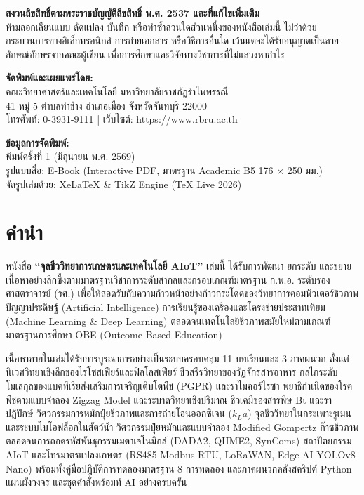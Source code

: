 \documentclass[10pt]{book}
\begin{document}
\vspace{0.2cm}
\noindent\textbf{สงวนลิขสิทธิ์ตามพระราชบัญญัติลิขสิทธิ์ พ.ศ. 2537 และที่แก้ไขเพิ่มเติม}\\
ห้ามลอกเลียนแบบ ดัดแปลง บันทึก หรือทำซ้ำส่วนใดส่วนหนึ่งของหนังสือเล่มนี้ ไม่ว่าด้วยกระบวนการทางอิเล็กทรอนิกส์ การถ่ายเอกสาร หรือวิธีการอื่นใด เว้นแต่จะได้รับอนุญาตเป็นลายลักษณ์อักษรจากคณะผู้เขียน เพื่อการศึกษาและวิจัยทางวิชาการที่ไม่แสวงหากำไร

\vspace{0.2cm}
\noindent\textbf{จัดพิมพ์และเผยแพร่โดย:}\\
คณะวิทยาศาสตร์และเทคโนโลยี มหาวิทยาลัยราชภัฏรำไพพรรณี\\
41 หมู่ 5 ตำบลท่าช้าง อำเภอเมือง จังหวัดจันทบุรี 22000\\
โทรศัพท์: 0-3931-9111 | เว็บไซต์: https://www.rbru.ac.th

\vspace{0.2cm}
\noindent\textbf{ข้อมูลการจัดพิมพ์:}\\
พิมพ์ครั้งที่ 1 (มิถุนายน พ.ศ. 2569)\\
รูปแบบสื่อ: E-Book (Interactive PDF, มาตรฐาน Academic B5 176 $\times$ 250 มม.)\\
จัดรูปเล่มด้วย: XeLaTeX \& TikZ Engine (TeX Live 2026)

\chapter*{คำนำ}

หนังสือ \textbf{``จุลชีววิทยาการเกษตรและเทคโนโลยี AIoT''} เล่มนี้ ได้รับการพัฒนา ยกระดับ และขยายเนื้อหาอย่างลึกซึ้งตามมาตรฐานวิชาการระดับสากลและกรอบเกณฑ์มาตรฐาน ก.พ.อ. ระดับรองศาสตราจารย์ (รศ.) เพื่อให้สอดรับกับความก้าวหน้าอย่างก้าวกระโดดของวิทยาการคอมพิวเตอร์ชีวภาพ ปัญญาประดิษฐ์ (Artificial Intelligence) การเรียนรู้ของเครื่องและโครงข่ายประสาทเทียม (Machine Learning \& Deep Learning) ตลอดจนเทคโนโลยีชีวภาพสมัยใหม่ตามเกณฑ์มาตรฐานการศึกษา OBE (Outcome-Based Education)

เนื้อหาภายในเล่มได้รับการบูรณาการอย่างเป็นระบบครอบคลุม 11 บทเรียนและ 3 ภาคผนวก ตั้งแต่นิเวศวิทยาเชิงลึกของไรโซสเฟียร์และฟิลโลสเฟียร์ ชีวสรีรวิทยาของวัฏจักรสารอาหาร กลไกระดับโมเลกุลของแบคทีเรียส่งเสริมการเจริญเติบโตพืช (PGPR) และราไมคอร์ไรซา พยาธิกำเนิดของโรคพืชตามแบบจำลอง Zigzag Model และระบาดวิทยาเชิงปริมาณ ชีวเคมีของสารพิษ Bt และราปฏิปักษ์ วิศวกรรมการหมักปุ๋ยชีวภาพและการถ่ายโอนออกซิเจน ($k_L a$) จุลชีววิทยาในกระเพาะรูเมนและระบบไบโอฟล็อกในสัตว์น้ำ วิศวกรรมปุ๋ยหมักและแบบจำลอง Modified Gompertz ก๊าซชีวภาพ ตลอดจนการถอดรหัสพันธุกรรมเมตาเจโนมิกส์ (DADA2, QIIME2, SynComs) สถาปัตยกรรม AIoT และโทรมาตรแปลงเกษตร (RS485 Modbus RTU, LoRaWAN, Edge AI YOLOv8-Nano) พร้อมทั้งคู่มือปฏิบัติการทดลองมาตรฐาน 8 การทดลอง และภาคผนวกคลังสคริปต์ Python แผนผังวงจร และชุดคำสั่งพร้อมท์ AI อย่างครบครัน
\end{document}
